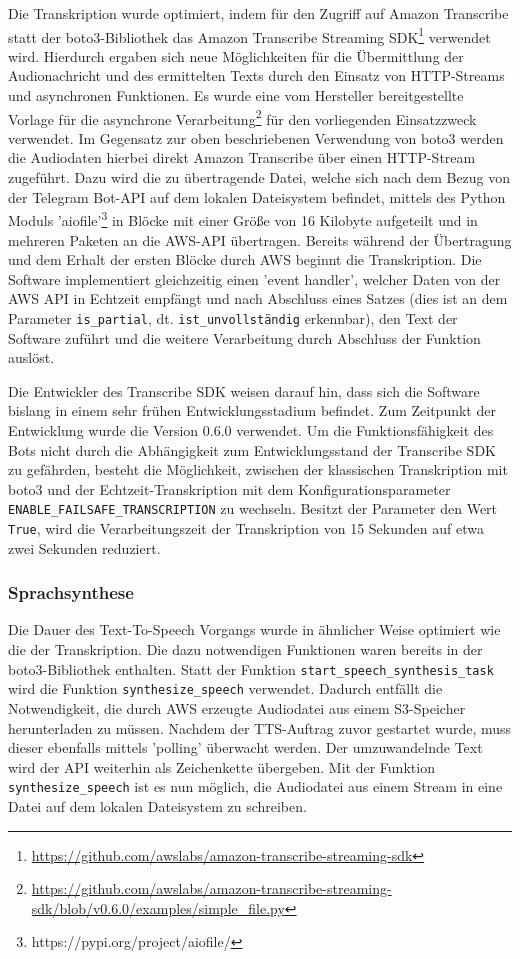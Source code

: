 Die Transkription wurde optimiert, indem für den Zugriff auf Amazon Transcribe statt der boto3-Bibliothek das Amazon Transcribe Streaming SDK\footnote{\url{https://github.com/awslabs/amazon-transcribe-streaming-sdk}} verwendet wird. Hierdurch ergaben sich neue Möglichkeiten für die Übermittlung der Audionachricht und des ermittelten Texts durch den Einsatz von HTTP-Streams und asynchronen Funktionen. Es wurde eine vom Hersteller bereitgestellte Vorlage für die asynchrone Verarbeitung\footnote{\url{https://github.com/awslabs/amazon-transcribe-streaming-sdk/blob/v0.6.0/examples/simple\_file.py}} für den vorliegenden Einsatzzweck verwendet. Im Gegensatz zur oben beschriebenen Verwendung von boto3 werden die Audiodaten hierbei direkt Amazon Transcribe über einen HTTP-Stream zugeführt. Dazu wird die zu übertragende Datei, welche sich nach dem Bezug von der Telegram Bot-API auf dem lokalen Dateisystem befindet, mittels des Python Moduls 'aiofile'\footnote{https://pypi.org/project/aiofile/} in Blöcke mit einer Größe von 16 Kilobyte aufgeteilt und in mehreren Paketen an die AWS-API übertragen. Bereits während der Übertragung und dem Erhalt der ersten Blöcke durch AWS beginnt die Transkription. Die Software implementiert gleichzeitig einen 'event handler', welcher Daten von der AWS API in Echtzeit empfängt und nach Abschluss eines Satzes (dies ist an dem Parameter \lstinline{is_partial}, dt. \lstinline{ist_unvollständig} erkennbar), den Text der Software zuführt und die weitere Verarbeitung durch Abschluss der Funktion auslöst.

Die Entwickler des Transcribe SDK weisen darauf hin, dass sich die Software bislang in einem sehr frühen Entwicklungsstadium befindet. Zum Zeitpunkt der Entwicklung wurde die Version 0.6.0 verwendet. Um die Funktionsfähigkeit des Bots nicht durch die Abhängigkeit zum Entwicklungsstand der Transcribe SDK zu gefährden, besteht die Möglichkeit, zwischen der klassischen Transkription mit boto3 und der Echtzeit-Transkription mit dem Konfigurationsparameter \lstinline{ENABLE_FAILSAFE_TRANSCRIPTION} zu wechseln. Besitzt der Parameter den Wert \lstinline{True}, wird die Verarbeitungszeit der Transkription von 15 Sekunden auf etwa zwei Sekunden reduziert.

\subsubsection{Sprachsynthese}
\label{sec:optimierung-synth}

Die Dauer des Text-To-Speech Vorgangs wurde in ähnlicher Weise optimiert wie die der Transkription. Die dazu notwendigen Funktionen waren bereits in der boto3-Bibliothek enthalten. Statt der Funktion \lstinline{start_speech_synthesis_task} wird die Funktion \lstinline{synthesize_speech} verwendet. Dadurch entfällt die Notwendigkeit, die durch AWS erzeugte Audiodatei aus einem S3-Speicher herunterladen zu müssen. Nachdem der TTS-Auftrag zuvor gestartet wurde, muss dieser ebenfalls mittels 'polling' überwacht werden. Der umzuwandelnde Text wird der API weiterhin als Zeichenkette übergeben. Mit der Funktion \lstinline{synthesize_speech} ist es nun möglich, die Audiodatei aus einem Stream in eine Datei auf dem lokalen Dateisystem zu schreiben. 

